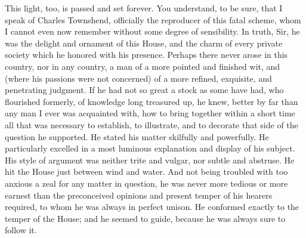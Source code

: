 This light, too, is passed and set forever. You understand, to be sure, that I speak of Charles Townshend, officially the reproducer of this fatal scheme, whom I cannot even now remember without some degree of sensibility. In truth, Sir, he was the delight and ornament of this House, and the charm of every private society which he honored with his presence. Perhaps there never arose in this country, nor in any country, a man of a more pointed and finished wit, and (where his passions were not concerned) of a more refined, exquisite, and penetrating judgment. If he had not so great a stock as some have had, who flourished formerly, of knowledge long treasured up, he knew, better by far than any man I ever was acquainted with, how to bring together within a short time all that was necessary to establish, to illustrate, and to decorate that side of the question he supported. He stated his matter skilfully and powerfully. He particularly excelled in a most luminous explanation and display of his subject. His style of argument was neither trite and vulgar, nor subtle and abstruse. He hit the House just between wind and water. And not being troubled with too anxious a zeal for any matter in question, he was never more tedious or more earnest than the preconceived opinions and present temper of his hearers required, to whom he was always in perfect unison. He conformed exactly to the temper of the House; and he seemed to guide, because he was always sure to follow it.

